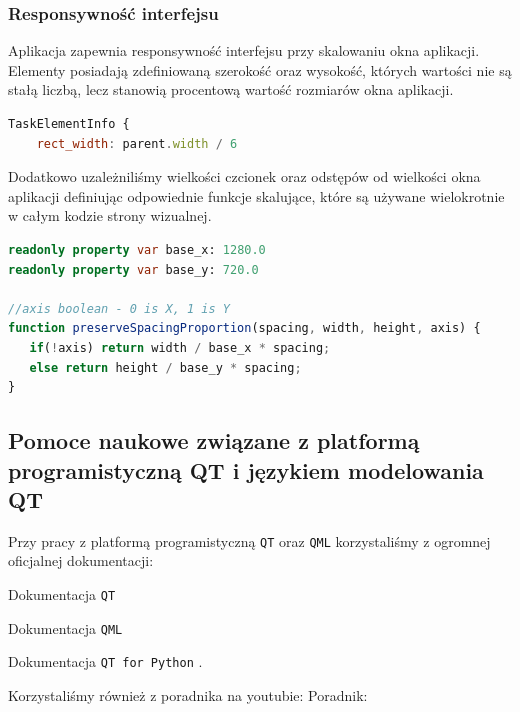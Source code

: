 \subsubsection{Responsywność interfejsu}
\label{sec:ResponsywnośćInterfejsu}
Aplikacja zapewnia responsywność interfejsu przy skalowaniu okna aplikacji. Elementy posiadają zdefiniowaną szerokość oraz wysokość, których wartości nie są stałą liczbą, lecz stanowią procentową wartość rozmiarów okna aplikacji.
\begin{lstlisting}[language=QML, caption={Przykładowy element o szerokości 1/6}]
TaskElementInfo {
    rect_width: parent.width / 6
\end{lstlisting}
Dodatkowo uzależniliśmy wielkości czcionek oraz odstępów od wielkości okna aplikacji definiując odpowiednie funkcje skalujące, które są używane wielokrotnie w całym kodzie strony wizualnej.
\begin{lstlisting}[language=QML, caption={Funkcja skalująca odstępy}]
readonly property var base_x: 1280.0
readonly property var base_y: 720.0
    
//axis boolean - 0 is X, 1 is Y
function preserveSpacingProportion(spacing, width, height, axis) {
   if(!axis) return width / base_x * spacing;
   else return height / base_y * spacing;
}
\end{lstlisting}

\subsection{Pomoce naukowe związane z platformą programistyczną QT i językiem modelowania QT}
\label{sec:PomoceNaukoweQML}
Przy pracy z platformą programistyczną \texttt{QT} oraz \texttt{QML} korzystaliśmy z ogromnej oficjalnej dokumentacji: 
\par
Dokumentacja \texttt{QT} \cite{DokumentacjaQT}
\par
Dokumentacja \texttt{QML} \cite{DokumentacjaQML}
\par
Dokumentacja \texttt{QT for Python} \cite{DokumentacjaQtForPython}.
\par
Korzystaliśmy również z poradnika na youtubie:
Poradnik: \cite{PoradnikQMLYoutube}